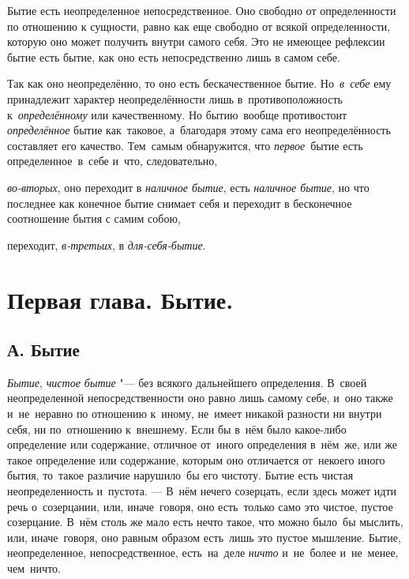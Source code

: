 \clearpage

Бытие есть неопределенное непосредственное. Оно свободно от определенности
по отношению к сущности, равно как еще свободно от всякой определенности,
которую оно может получить внутри самого себя. Это не имеющее рефлексии
бытие есть бытие, как оно есть непосредственно лишь в самом себе.

Так как оно неопределённо, то оно есть бескачественное бытие.
Но~{\em в~себе} ему принадлежит характер неопределённости
лишь в~противоположность к~{\em определённому} или
качественному. Но бытию~вообще противостоит
{\em определённое} бытие как~таковое, а~благодаря этому
сама его неопределённость составляет его качество. Тем~самым
обнаружится, что {\em первое}~бытие есть определенное~в~себе
и~что, следовательно,

{\em во-вторых}, оно переходит в
{\em наличное бытие}, есть
{\em наличное бытие}, но что последнее как конечное
бытие снимает себя и переходит в бесконечное
соотношение бытия с самим собою,

переходит, {\em в-третьих}, в {\em для-себя-бытие}.

\chapter[{\em Первая глава} Бытие]{Первая глава. Бытие.}
\section[А. Бытие]{А. Бытие}

{\em Бытие}, {\em чистое бытие} "--- без всякого дальнейшего определения.
В~своей неопределенной непосредственности оно равно лишь
самому себе, и~оно также и~не~неравно по отношению к~иному, не~имеет
никакой разности ни внутри себя, ни по~отношению к~внешнему. Если бы
в~нём было какое-либо определение или
содержание, отличное от~иного определения в~нём~же, или же такое
определение или содержание, которым оно отличается от~некоего иного
бытия, то~такое различие нарушило~бы его чистоту. Бытие есть чистая
неопределенность и~пустота. --- В~нём нечего созерцать, если здесь
может идти речь о~созерцании, или, иначе~говоря, оно есть~только само
это чистое, пустое созерцание.
В~нём столь же мало есть нечто такое, что можно было~бы
мыслить, или, иначе~говоря, оно равным образом есть~лишь это пустое
мышление. Бытие, неопределенное, непосредственное, есть~на~деле
{\em ничто} и~не~более и~не~менее, чем~ничто.

